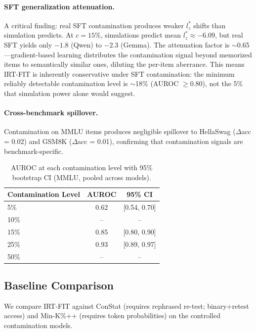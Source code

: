 \documentclass[11pt,a4paper]{article}
\begin{document}
\paragraph{SFT generalization attenuation.} A critical finding: real SFT contamination produces weaker $l_z^*$ shifts than simulation predicts. At $c=15\%$, simulations predict mean $l_z^* \approx -6.09$, but real SFT yields only $-1.8$ (Qwen) to $-2.3$ (Gemma). The attenuation factor is ${\sim}$0.65---gradient-based learning distributes the contamination signal beyond memorized items to semantically similar ones, diluting the per-item aberrance. This means IRT-FIT is inherently conservative under SFT contamination: the minimum reliably detectable contamination level is ${\sim}$18\% (AUROC $\geq 0.80$), not the 5\% that simulation power alone would suggest.

\paragraph{Cross-benchmark spillover.} Contamination on MMLU items produces negligible spillover to HellaSwag ($\Delta$acc = 0.02) and GSM8K ($\Delta$acc = 0.01), confirming that contamination signals are benchmark-specific.

\begin{table}[t]
\centering
\caption{AUROC at each contamination level with 95\% bootstrap CI (MMLU, pooled across models).}
\label{tab:auroc_summary}
\small
\begin{tabular}{l c c}
\toprule
Contamination Level & AUROC & 95\% CI \\
\midrule
5\% & 0.62 & [0.54, 0.70] \\
10\% & -- & -- \\
15\% & 0.85 & [0.80, 0.90] \\
25\% & 0.93 & [0.89, 0.97] \\
50\% & -- & -- \\
\bottomrule
\end{tabular}
\end{table}

\subsection{Baseline Comparison}
\label{sec:baselines}

We compare IRT-FIT against ConStat \citep{dekoninck2024constat} (requires rephrased re-test; binary+retest access) and Min-K\%++ \citep{shi2024detecting} (requires token probabilities) on the controlled contamination models.
\end{document}
